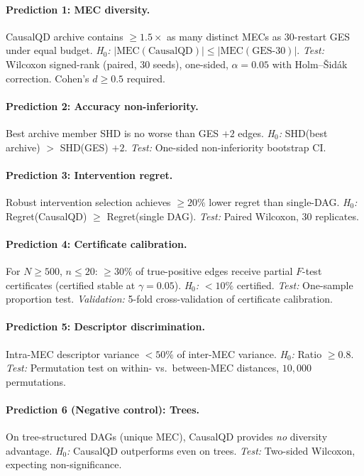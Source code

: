 \documentclass{article}
\theoremstyle{definition}
\theoremstyle{plain}
\theoremstyle{remark}
\begin{document}
\paragraph{Prediction 1: MEC diversity.}
CausalQD archive contains $\geq 1.5\times$ as many distinct MECs as 30-restart
GES under equal budget.
\emph{H$_0$:} $|\text{MEC}(\text{CausalQD})| \leq |\text{MEC}(\text{GES-30})|$.
\emph{Test:} Wilcoxon signed-rank (paired, 30 seeds), one-sided, $\alpha = 0.05$
with Holm--\v{S}id\'ak correction. Cohen's $d \geq 0.5$ required.

\paragraph{Prediction 2: Accuracy non-inferiority.}
Best archive member SHD is no worse than GES $+ 2$ edges.
\emph{H$_0$:} SHD(best archive) $>$ SHD(GES) $+ 2$.
\emph{Test:} One-sided non-inferiority bootstrap CI.

\paragraph{Prediction 3: Intervention regret.}
Robust intervention selection achieves $\geq 20\%$ lower regret than single-DAG.
\emph{H$_0$:} Regret(CausalQD) $\geq$ Regret(single DAG).
\emph{Test:} Paired Wilcoxon, 30 replicates.

\paragraph{Prediction 4: Certificate calibration.}
For $N \geq 500$, $n \leq 20$: $\geq 30\%$ of true-positive edges receive
partial $F$-test certificates (certified stable at $\gamma = 0.05$).
\emph{H$_0$:} $< 10\%$ certified.
\emph{Test:} One-sample proportion test.
\emph{Validation:} 5-fold cross-validation of certificate calibration.

\paragraph{Prediction 5: Descriptor discrimination.}
Intra-MEC descriptor variance $< 50\%$ of inter-MEC variance.
\emph{H$_0$:} Ratio $\geq 0.8$.
\emph{Test:} Permutation test on within- vs.\ between-MEC distances,
$10{,}000$ permutations.

\paragraph{Prediction 6 (Negative control): Trees.}
On tree-structured DAGs (unique MEC), CausalQD provides \emph{no} diversity
advantage.
\emph{H$_0$:} CausalQD outperforms even on trees.
\emph{Test:} Two-sided Wilcoxon, expecting non-significance.
\end{document}
